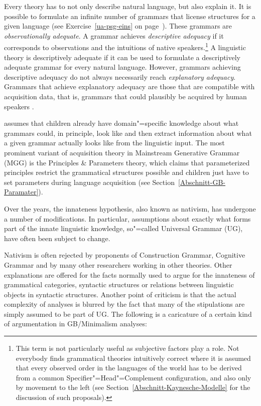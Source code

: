 Every theory has to not only describe natural language, but also explain it. It is possible to
formulate an infinite number of grammars that license structures for a given language (see Exercise~\ref{ua-psg-eins} on page~\pageref{ua-psg-eins}). These grammars are \emph{observationally adequate}.
A grammar achieves \emph{descriptive adequacy} if it corresponds to observations and the intuitions of native speakers.\footnote{
This term is not particularly useful as subjective factors play a role. Not everybody finds grammatical theories intuitively correct where it is assumed that every
observed order in the languages of the world has to be derived from a common
Specifier"=Head"=Complement configuration, and also only by movement to the left (see Section~\ref{Abschnitt-Kaynesche-Modelle} for the discussion of such proposals).
}
A linguistic theory is descriptively adequate if it can be used to formulate a descriptively adequate grammar for every natural language. However, grammars achieving descriptive
adequacy do not always necessarily reach \emph{explanatory adequacy}. Grammars that achieve explanatory adequacy are those that are compatible with
acquisition data, that is, grammars that could plausibly be acquired by human speakers \citep[--25]{Chomsky65a}.

\citet[]{Chomsky65a} assumes that children already have domain"=specific knowledge about what grammars could, in principle, look like and then extract information about what
a given grammar actually looks like from the linguistic input. The most prominent variant of acquisition theory in Mainstream Generative Grammar (MGG) is the Principles \& Parameters
theory, which claims that parameterized principles restrict the grammatical structures possible and
children just have to set parameters during language acquisition
(see Section~\ref{Abschnitt-GB-Paramater}).

Over the years, the innateness hypothesis, also known as nativism, has undergone a number of modifications.
In particular, assumptions about exactly what forms part of the innate linguistic knowledge,
so"=called Universal Grammar (UG), have often been subject to change.

Nativism is often rejected by proponents of Construction Grammar\indexcxg, Cognitive
Grammar and by many other researchers working in other theories. Other
explanations are offered for the facts normally used to argue for the innateness of grammatical
categories, syntactic structures or relations between linguistic objects in syntactic structures.
Another point of criticism is that the actual complexity of analyses is blurred by the fact that many of the stipulations are simply assumed to be part of UG.
The following is a caricature of a certain kind of argumentation in GB/Minimalism analyses: 

